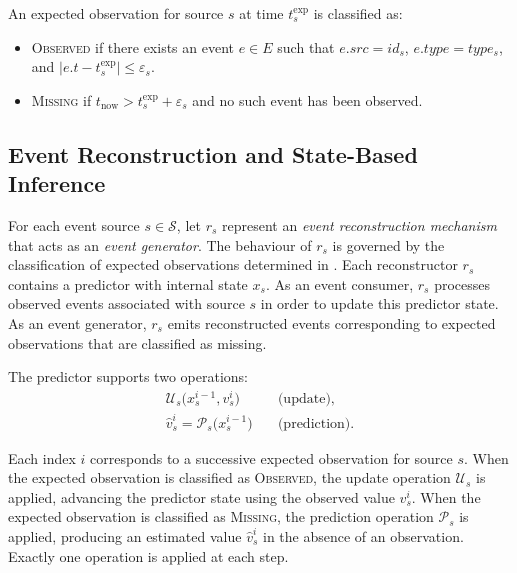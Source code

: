 An expected observation for source $s$ at time $t^{\mathrm{exp}}_s$ is classified as:
\begin{itemize}
    \item \textsc{Observed} if there exists an event $e \in E$ such that $e.src = id_s$, $e.type = type_s$, and $\lvert e.t - t^{\mathrm{exp}}_s \rvert \le \varepsilon_s$.
    \item \textsc{Missing} if $t_{\mathrm{now}} > t^{\mathrm{exp}}_s + \varepsilon_s$ and no such event has been observed.
\end{itemize}
\noindent




\subsection{Event Reconstruction and State-Based Inference}
\label{sec:state-based-inference}

For each event source $s \in \mathcal{S}$, let $r_s$ represent an \emph{event reconstruction mechanism} that acts as an \emph{event generator}. The behaviour of $r_s$ is governed by the classification of expected observations determined in .
Each reconstructor $r_s$ contains a predictor with internal state $x_s$. As an event consumer, $r_s$ processes observed events associated with source $s$ in order to update this predictor state. As an event generator, $r_s$ emits reconstructed events corresponding to expected observations that are classified as missing.

The predictor supports two operations:
\begin{align}
\mathcal{U}_s\bigl(x_s^{i-1}, v_s^{i}\bigr)
&\quad\text{(update)}, \\
\hat{v}_s^{i} = \mathcal{P}_s\bigl(x_s^{i-1}\bigr)
&\quad\text{(prediction)}.
\end{align}

Each index $i$ corresponds to a successive expected observation for source $s$. When the expected observation is classified as \textsc{Observed}, the update operation $\mathcal{U}_s$ is applied, advancing the predictor state using the observed value $v_s^{i}$. When the expected observation is classified as \textsc{Missing}, the prediction operation $\mathcal{P}_s$ is applied, producing an estimated value $\hat{v}_s^{i}$ in the absence of an observation. Exactly one operation is applied at each step.


